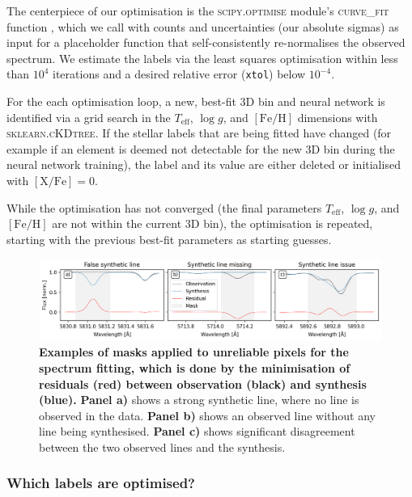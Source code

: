\documentclass[
  journal=pasa,
  manuscript=research-paper, %
  year=2023,
  volume=37
]{cup-journal}
\newcommand{\Teff}{$T_\mathrm{eff}$\xspace}
\newcommand{\logg}{$\log g$\xspace}
\newcommand{\feh}{$\mathrm{[Fe/H]}$\xspace}
\newcommand{\TLF}{\Teff, \logg, and \feh}
\begin{document}
The centerpiece of our optimisation is the \textsc{scipy.optimise} module's \textsc{curve\_fit} function \citep{scipy}, which we call with counts and uncertainties (our absolute sigmas) as input for a placeholder function that self-consistently re-normalises the observed spectrum. We estimate the labels via the least squares optimisation within less than $10^4$ iterations and a desired relative error (\texttt{xtol}) below $10^{-4}$.

For the each optimisation loop, a new, best-fit 3D bin and neural network is identified via a grid search in the \TLF dimensions with \textsc{sklearn.cKDtree}. If the stellar labels that are being fitted have changed (for example if an element is deemed not detectable for the new 3D bin during the neural network training), the label and its value are either deleted or initialised with $\mathrm{[X/Fe]} = 0$.

While the optimisation has not converged (the final parameters \TLF are not within the current 3D bin), the optimisation is repeated, starting with the previous best-fit parameters as starting guesses.

\begin{figure}[ht]
\centering  
\includegraphics[width=\textwidth]{figures/example_masking_sun.png}
\caption{\textbf{Examples of masks applied to unreliable pixels for the spectrum fitting, which is done by the minimisation of residuals (red) between observation (black) and synthesis (blue).} \textbf{Panel a)} shows a strong synthetic line, where no line is observed in the data. \textbf{Panel b)} shows an observed line without any line being synthesised. \textbf{Panel c)} shows significant disagreement between the two observed lines and the synthesis.} \label{fig:example_masking_sun}
\end{figure}

\subsubsection{Which labels are optimised?} \label{sec:which_labels_are_optimised}

\end{document}
